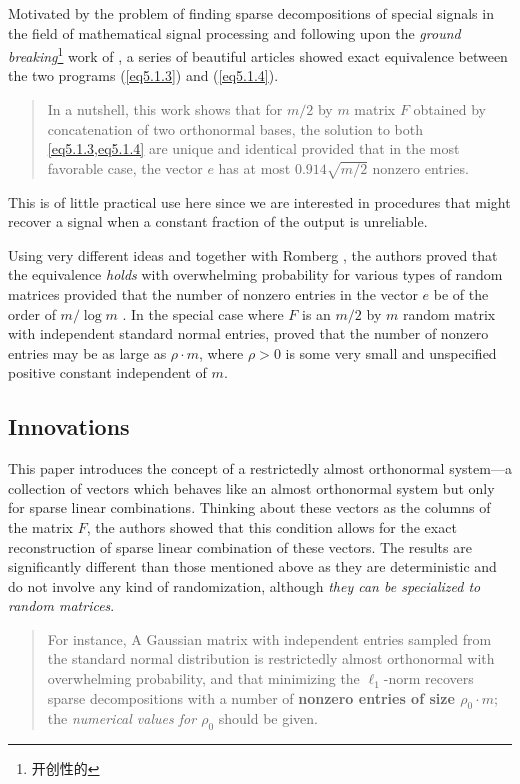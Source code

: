 Motivated by the problem of finding sparse decompositions of special signals in the field of mathematical signal processing and following upon the \emph{ground breaking}\footnote{开创性的} work of \cite{Donoho2001}, a series of beautiful articles \cite{2-33,2-27,2-28,Tropp2004} showed exact equivalence between the two programs (\cref{eq5.1.3}) and (\cref{eq5.1.4}). 
\begin{quote}
    In a nutshell, this work shows that for $m/2$ by $m$ matrix $F$ obtained by concatenation of two orthonormal bases, the solution to both \cref{eq5.1.3,eq5.1.4} are \textcolor[rgb]{1,0,0}{unique and identical} provided that in the most favorable case, the vector $e$ has at most $0.914 \sqrt{m/2}$ nonzero entries.
\end{quote}
This is of little practical use here since we are interested in procedures that might recover a signal when \textcolor[rgb]{1,0,0}{a constant fraction of the output is unreliable}.

Using very different ideas and together with Romberg \cite{Candes2006}, the authors proved that the equivalence \emph{\textcolor[rgb]{1,0,0}{holds}} with \textcolor[rgb]{1,0,0}{overwhelming probability for various types of random matrices} provided that the number of nonzero entries in the vector $e$ be of the order of $m/\log m$ \cite{2-7,Candes2006a}. In the special case where $F$ is an $m/2$ by $m$ random matrix with independent standard normal entries, \cite{Donoho2006} proved that \textcolor[rgb]{1,0,0}{the number of nonzero entries may be as large as $\rho \cdot m$}, where $\rho > 0$ is some \textcolor[rgb]{1,0,0}{very small and unspecified positive constant} independent of $m$.

\subsection{Innovations}
This paper introduces the concept of \textcolor[rgb]{1,0,0}{a restrictedly almost orthonormal system}---a collection of vectors which \textcolor[rgb]{1,0,0}{behaves like an almost orthonormal system but only for sparse linear combinations}. Thinking about these vectors as the columns of the matrix $F$, the authors showed that this condition allows for the exact reconstruction of sparse linear combination of these vectors. The results are significantly different than those mentioned above as they are \textcolor[rgb]{1,0,0}{deterministic and do not involve any kind of randomization}, although \emph{they can be specialized to random matrices}.
\begin{quote}
    For instance, A Gaussian matrix with independent entries sampled from the standard normal distribution is \textcolor[rgb]{1,0,0}{restrictedly almost orthonormal with overwhelming probability}, and that \textcolor[rgb]{1,0,0}{minimizing the $\ell_1$-norm recovers sparse decompositions} with a number of \textbf{nonzero entries of size $\rho_0 \cdot m$}; the \emph{numerical values for $\rho_0$} should be given.
\end{quote}

